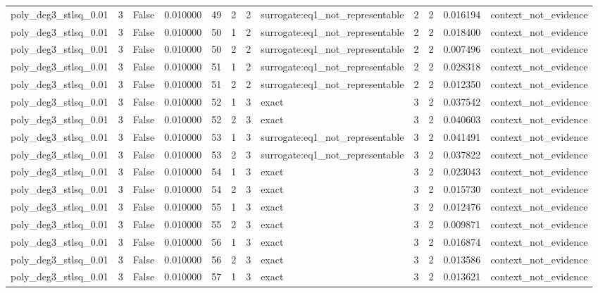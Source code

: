 \begin{tabular}{lrrrrrrlrrrl}
poly\_deg3\_stlsq\_0.01 & 3 & False & 0.010000 & 49 & 2 & 2 & surrogate:eq1\_not\_representable & 2 & 2 & 0.016194 & context\_not\_evidence \\
poly\_deg3\_stlsq\_0.01 & 3 & False & 0.010000 & 50 & 1 & 2 & surrogate:eq1\_not\_representable & 2 & 2 & 0.018400 & context\_not\_evidence \\
poly\_deg3\_stlsq\_0.01 & 3 & False & 0.010000 & 50 & 2 & 2 & surrogate:eq1\_not\_representable & 2 & 2 & 0.007496 & context\_not\_evidence \\
poly\_deg3\_stlsq\_0.01 & 3 & False & 0.010000 & 51 & 1 & 2 & surrogate:eq1\_not\_representable & 2 & 2 & 0.028318 & context\_not\_evidence \\
poly\_deg3\_stlsq\_0.01 & 3 & False & 0.010000 & 51 & 2 & 2 & surrogate:eq1\_not\_representable & 2 & 2 & 0.012350 & context\_not\_evidence \\
poly\_deg3\_stlsq\_0.01 & 3 & False & 0.010000 & 52 & 1 & 3 & exact & 3 & 2 & 0.037542 & context\_not\_evidence \\
poly\_deg3\_stlsq\_0.01 & 3 & False & 0.010000 & 52 & 2 & 3 & exact & 3 & 2 & 0.040603 & context\_not\_evidence \\
poly\_deg3\_stlsq\_0.01 & 3 & False & 0.010000 & 53 & 1 & 3 & surrogate:eq1\_not\_representable & 3 & 2 & 0.041491 & context\_not\_evidence \\
poly\_deg3\_stlsq\_0.01 & 3 & False & 0.010000 & 53 & 2 & 3 & surrogate:eq1\_not\_representable & 3 & 2 & 0.037822 & context\_not\_evidence \\
poly\_deg3\_stlsq\_0.01 & 3 & False & 0.010000 & 54 & 1 & 3 & exact & 3 & 2 & 0.023043 & context\_not\_evidence \\
poly\_deg3\_stlsq\_0.01 & 3 & False & 0.010000 & 54 & 2 & 3 & exact & 3 & 2 & 0.015730 & context\_not\_evidence \\
poly\_deg3\_stlsq\_0.01 & 3 & False & 0.010000 & 55 & 1 & 3 & exact & 3 & 2 & 0.012476 & context\_not\_evidence \\
poly\_deg3\_stlsq\_0.01 & 3 & False & 0.010000 & 55 & 2 & 3 & exact & 3 & 2 & 0.009871 & context\_not\_evidence \\
poly\_deg3\_stlsq\_0.01 & 3 & False & 0.010000 & 56 & 1 & 3 & exact & 3 & 2 & 0.016874 & context\_not\_evidence \\
poly\_deg3\_stlsq\_0.01 & 3 & False & 0.010000 & 56 & 2 & 3 & exact & 3 & 2 & 0.013586 & context\_not\_evidence \\
poly\_deg3\_stlsq\_0.01 & 3 & False & 0.010000 & 57 & 1 & 3 & exact & 3 & 2 & 0.013621 & context\_not\_evidence \\

\end{tabular}
